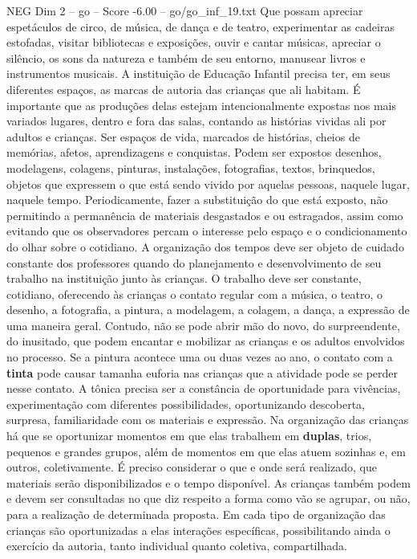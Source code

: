 \begin{textsample}{NEG Dim 2 – go – Score -6.00 – go/go\_inf\_19.txt}
Que possam apreciar espetáculos de circo, de música, de dança e de teatro, experimentar as cadeiras estofadas, visitar bibliotecas e exposições, ouvir e cantar músicas, apreciar o silêncio, os sons da natureza e também de seu entorno, manusear livros e instrumentos musicais.
A instituição de Educação Infantil precisa ter, em seus diferentes espaços, as marcas de autoria das crianças que ali habitam.
É importante que as produções delas estejam intencionalmente expostas nos mais variados lugares, dentro e fora das salas, contando as histórias vividas ali por adultos e crianças.
Ser espaços de vida, marcados de histórias, cheios de memórias, afetos, aprendizagens e conquistas.
Podem ser expostos desenhos, modelagens, colagens, pinturas, instalações, fotografias, textos, brinquedos, objetos que expressem o que está sendo vivido por aquelas pessoas, naquele lugar, naquele tempo.
Periodicamente, fazer a substituição do que está exposto, não permitindo a permanência de materiais desgastados e ou estragados, assim como evitando que os observadores percam o interesse pelo espaço e o condicionamento do olhar sobre o cotidiano.
A organização dos tempos deve ser objeto de cuidado constante dos professores quando do planejamento e desenvolvimento de seu trabalho na instituição junto às crianças.
O trabalho deve ser constante, cotidiano, oferecendo às crianças o contato regular com a música, o teatro, o desenho, a fotografia, a pintura, a modelagem, a colagem, a dança, a expressão de uma maneira geral.
Contudo, não se pode abrir mão do novo, do surpreendente, do inusitado, que podem encantar e mobilizar as crianças e os adultos envolvidos no processo.
Se a pintura acontece uma ou duas vezes ao ano, o contato com a \textbf{tinta} pode causar tamanha euforia nas crianças que a atividade pode se perder nesse contato.
A tônica precisa ser a constância de oportunidade para vivências, experimentação com diferentes possibilidades, oportunizando descoberta, surpresa, familiaridade com os materiais e expressão.
Na organização das crianças há que se oportunizar momentos em que elas trabalhem em \textbf{duplas}, trios, pequenos e grandes grupos, além de momentos em que elas atuem sozinhas e, em outros, coletivamente.
É preciso considerar o que e onde será realizado, que materiais serão disponibilizados e o tempo disponível.
As crianças também podem e devem ser consultadas no que diz respeito a forma como vão se agrupar, ou não, para a realização de determinada proposta.
Em cada tipo de organização das crianças são oportunizadas a elas interações específicas, possibilitando ainda o exercício da autoria, tanto individual quanto coletiva, compartilhada.

\end{textsample}
